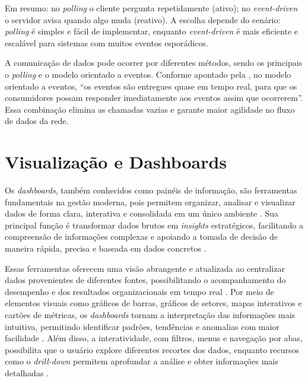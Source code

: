 \documentclass[
    12pt
    ,oneside
    ,a4paper
    ,chapter=TITLE
    ,section=TITLE
    ,sumario=abnt-6027-2012]{abntex2}
\begin{document}
Em resumo: no \textit{polling} o cliente pergunta repetidamente (ativo); no \textit{event-driven} o servidor avisa quando algo muda (reativo). A escolha depende do cenário: \textit{polling} é simples e fácil de implementar, enquanto \textit{event-driven} é mais eficiente e escalável para sistemas com muitos eventos esporádicos.

A comunicação de dados pode ocorrer por diferentes métodos, sendo os principais o \textit{polling} e o modelo orientado a eventos. Conforme apontado pela , no modelo orientado a eventos, “os eventos são entregues quase em tempo real, para que os consumidores possam responder imediatamente aos eventos assim que ocorrerem”. Essa combinação elimina as chamadas vazias e garante maior agilidade no fluxo de dados da rede.



\chapter{Visualização e Dashboards}
\label{cap:dash}

Os \textit{dashboards}, também conhecidos como painéis de informação, são ferramentas fundamentais na gestão moderna, pois permitem organizar, analisar e visualizar dados de forma clara, interativa e consolidada em um único ambiente \cite{ufms2024}. Sua principal função é transformar dados brutos em \textit{insights} estratégicos, facilitando a compreensão de informações complexas e apoiando a tomada de decisão de maneira rápida, precisa e baseada em dados concretos \cite{rolim2020}.

Essas ferramentas oferecem uma visão abrangente e atualizada ao centralizar dados provenientes de diferentes fontes, possibilitando o acompanhamento do desempenho e dos resultados organizacionais em tempo real \cite{ufms2024}. Por meio de elementos visuais como gráficos de barras, gráficos de setores, mapas interativos e cartões de métricas, os \textit{dashboards} tornam a interpretação das informações mais intuitiva, permitindo identificar padrões, tendências e anomalias com maior facilidade \cite{campos2023}. Além disso, a interatividade, com filtros, menus e navegação por abas, possibilita que o usuário explore diferentes recortes dos dados, enquanto recursos como o \textit{drill-down} permitem aprofundar a análise e obter informações mais detalhadas \cite{campos2023}.
\end{document}

